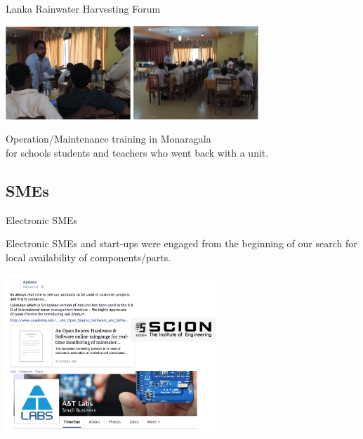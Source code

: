 \documentclass[xcolor=dvipsnames,beamer,unknownkeysallowed]{beamer} %
\begin{document}
\begin{frame}[fragile]{Lanka Rainwater Harvesting Forum}
\begin{center}
 \includegraphics[width=4.7cm]{2}
  \hspace{2mm}
 \includegraphics[width=4.7cm]{3}\\
\end{center}

\begin{center}
Operation/Maintenance training in Monaragala\\
for schools students and teachers who went back with a unit.
\end{center}

\end{frame}

\subsection{SMEs}
\begin{frame}[fragile]{Electronic SMEs}

Electronic SMEs and start-ups were engaged from the beginning of our search for local availability of components/parts.

\begin{center}
  \includegraphics[width=8cm]{LK_SMEs}
\end{center}

\end{frame}
\end{document}
